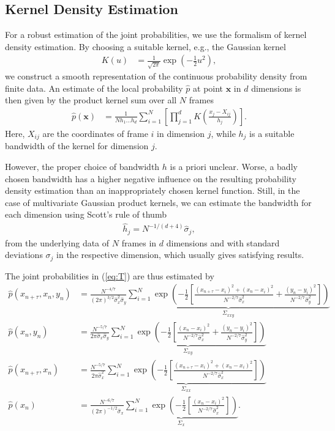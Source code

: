 \documentclass[12pt,a4paper,twoside,english,fleqn,preprint,aps,prb]{revtex4}
\newcommand{\xx}{\mathbf{x}}
\begin{document}
\subsection{Kernel Density Estimation} For a robust estimation of the joint
probabilities, we use the formalism of kernel density estimation.  By choosing
a suitable kernel, e.g., the Gaussian kernel \begin{align} K(u) &=
\frac{1}{\sqrt{2\pi}} \exp(-\frac{1}{2} u^2), \end{align} we construct a smooth
representation of the continuous probability density from finite data.  An
estimate of the local probability $\hat{p}$ at point $\xx$ in $d$ dimensions is
then given by the product kernel sum over all $N$ frames \begin{align}
\hat{p}(\xx) &= \frac{1}{N h_1 \dots h_d} \sum_{i=1}^{N}\left[ \prod_{j=1}^{d}
K\left(\frac{x_j - X_{ij}}{h_j} \right)\right].  \end{align} Here, $X_{ij}$ are
the coordinates of frame $i$ in dimension $j$, while $h_j$ is a suitable
bandwidth of the kernel for dimension $j$.

However, the proper choice of bandwidth $h$ is a priori unclear.  Worse, a
badly chosen bandwidth has a higher negative influence on the resulting
probability density estimation than an inappropriately chosen kernel function.
Still, in the case of multivariate Gaussian product kernels, we can estimate
the bandwidth for each dimension using Scott's rule of thumb \begin{align}
\hat{h}_j = N^{-1/(d+4)} \hat{\sigma}_j, \end{align} from the underlying data
of $N$ frames in $d$ dimensions and with standard deviations $\sigma_j$ in the
respective dimension, which usually gives satisfying results.

The joint probabilities in (\ref{eq:T}) are thus estimated by \begin{align}
  \hat{p}(x_{n+\tau}, x_n, y_n) &= \frac{N^{-4/7}}{(2\pi)^{3/2}
\hat{\sigma}_x^2 \hat{\sigma}_y} \underbrace{\sum_{i=1}^N \exp
  \left(-\frac{1}{2} \left[ \frac{(x_{n+\tau}-x_i)^2 + (x_n -
      x_i)^2}{N^{-2/7}\hat{\sigma}_x^2} + \frac{(y_n -
      y_i)^2}{N^{-2/7}\hat{\sigma}_y^2} \right] \right)}_{\Sigma_{xxy}}  \\
      \hat{p}(x_n, y_n) &= \frac{N^{-5/7}}{2\pi \hat{\sigma}_x \hat{\sigma}_y}
      \underbrace{\sum_{i=1}^N \exp \left(-\frac{1}{2} \left[ \frac{(x_n -
            x_i)^2}{N^{-2/7}\hat{\sigma}_x^2} + \frac{(y_n -
            y_i)^2}{N^{-2/7}\hat{\sigma}_y^2} \right] \right)}_{\Sigma_{xy}}
            \\ \hat{p}(x_{n+\tau}, x_n) &= \frac{N^{-5/7}}{2\pi
          \hat{\sigma}_x^2} \underbrace{\sum_{i=1}^N \exp \left(-\frac{1}{2}
              \left[ \frac{(x_{n+\tau} - x_i)^2 + (x_n -
                x_i)^2}{N^{-2/7}\hat{\sigma}_x^2} \right] \right)
              }_{\Sigma_{xx}} \\ \hat{p}(x_n) &= \frac{N^{-6/7}}{(2\pi)^{-1/2}
              \hat{\sigma}_x} \underbrace{\sum_{i=1}^N \exp \left(-\frac{1}{2}
                  \left[ \frac{(x_n - x_i)^2}{N^{-2/7}\hat{\sigma}_x^2} \right]
            \right)}_{\Sigma_{x}}.  \end{align}
\end{document}
